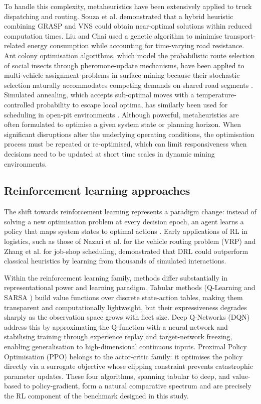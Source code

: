 \documentclass[11pt,a4paper]{article}
\begin{document}
To handle this complexity, metaheuristics have been extensively applied to truck dispatching and routing. Souza et al. \cite{Souza2010} demonstrated that a hybrid heuristic combining GRASP and VNS could obtain near-optimal solutions within reduced computation times. Liu and Chai \cite{GuangweiLiu2019} used a genetic algorithm to minimise transport-related energy consumption while accounting for time-varying road resistance. Ant colony optimisation algorithms, which model the probabilistic route selection of social insects through pheromone-update mechanisms, have been applied to multi-vehicle assignment problems in surface mining because their stochastic selection naturally accommodates competing demands on shared road segments \cite{ShivPrakashUpadhyay2017}. Simulated annealing, which accepts sub-optimal moves with a temperature-controlled probability to escape local optima, has similarly been used for scheduling in open-pit environments \cite{BurakOzdemir2019}. Although powerful, metaheuristics are often formulated to optimise a given system state or planning horizon. When significant disruptions alter the underlying operating conditions, the optimisation process must be repeated or re-optimised, which can limit responsiveness when decisions need to be updated at short time scales in dynamic mining environments.

\subsection{Reinforcement learning approaches}

The shift towards reinforcement learning represents a paradigm change: instead of solving a new optimisation problem at every decision epoch, an agent learns a policy that maps system states to optimal actions \cite{RichardSutton2018, MoezKrichen2022}. Early applications of RL in logistics, such as those of Nazari et al. \cite{MohammadrezaNazari2018} for the vehicle routing problem (VRP) and Zhang et al. \cite{CongZhang2020} for job-shop scheduling, demonstrated that DRL could outperform classical heuristics by learning from thousands of simulated interactions.

Within the reinforcement learning family, methods differ substantially in representational power and learning paradigm. Tabular methods (Q-Learning and SARSA \cite{RichardSutton2018}) build value functions over discrete state-action tables, making them transparent and computationally lightweight, but their expressiveness degrades sharply as the observation space grows with fleet size. Deep Q-Networks (DQN) address this by approximating the Q-function with a neural network and stabilising training through experience replay and target-network freezing, enabling generalisation to high-dimensional continuous inputs. Proximal Policy Optimisation (PPO) \cite{JohnSchulman2017} belongs to the actor-critic family: it optimises the policy directly via a surrogate objective whose clipping constraint prevents catastrophic parameter updates. These four algorithms, spanning tabular to deep, and value-based to policy-gradient, form a natural comparative spectrum and are precisely the RL component of the benchmark designed in this study.
\end{document}
